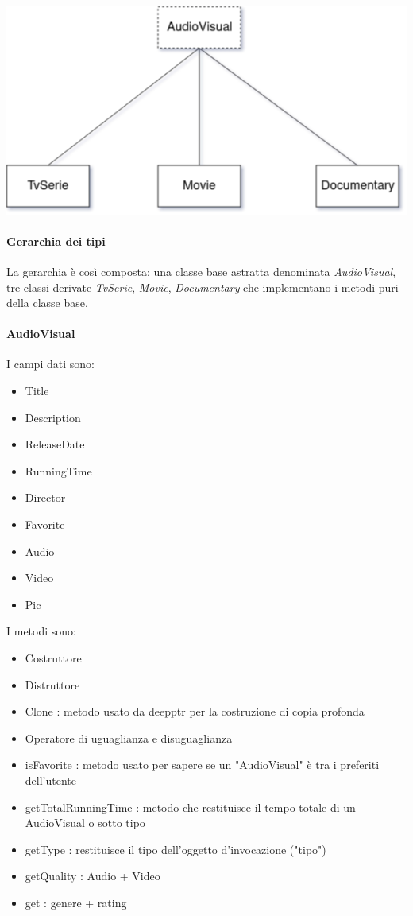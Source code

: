 \includegraphics[width=1\textwidth]{gerarchia}
\paragraph{Gerarchia dei tipi}
La gerarchia è così composta: una classe base astratta denominata \textit{AudioVisual}, tre classi derivate \textit{TvSerie}, \textit{Movie}, \textit{Documentary} che implementano i metodi puri della classe base. \newline

\paragraph{AudioVisual}
I campi dati sono:
\begin{itemize}
    \item Title
    \item Description
    \item ReleaseDate
    \item RunningTime
    \item Director
    \item Favorite
    \item Audio
    \item Video %
    \item Pic %
\end{itemize}
I metodi sono:
\begin{itemize}
    \item Costruttore
    \item Distruttore
    \item Clone : metodo usato da deepptr per la costruzione di copia profonda
    \item Operatore di uguaglianza e disuguaglianza
    \item isFavorite : metodo usato per sapere se un "AudioVisual" è tra i preferiti dell'utente
    \item getTotalRunningTime : metodo che restituisce il tempo totale di un AudioVisual o sotto tipo
    \item getType : restituisce il tipo dell'oggetto d'invocazione ("tipo")
    \item getQuality : Audio + Video %
    \item get : genere + rating 
\end{itemize}

